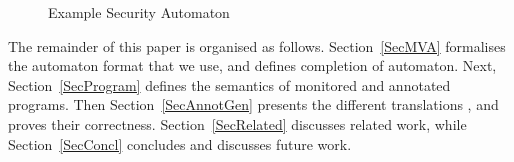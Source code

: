 
\begin{figure}[t]
\begin{center}
\end{center}
\caption{Example Security Automaton}\label{FigExample}
\end{figure}

The remainder of this paper is organised as
follows. Section~\ref{SecMVA} formalises the automaton format that we
use, and defines completion of automaton. Next,
Section~\ref{SecProgram} defines the semantics of monitored and
annotated programs. Then Section~\ref{SecAnnotGen} presents the
different translations , and proves their
correctness. Section~\ref{SecRelated} discusses related work, while
Section~\ref{SecConcl} concludes and discusses future work.

